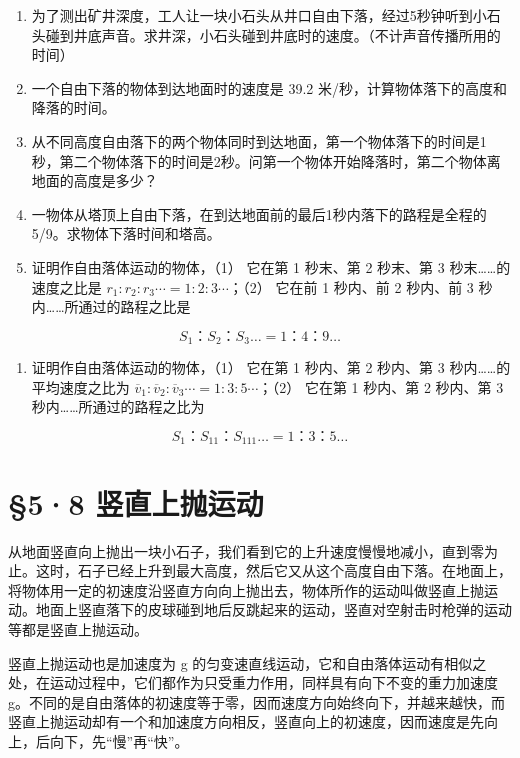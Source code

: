 \begin{enumerate}
\def\labelenumi{\arabic{enumi}.}
\item
  为了测出矿井深度，工人让一块小石头从井口自由下落，经过5秒钟听到小石头碰到井底声音。求井深，小石头碰到井底时的速度。（不计声音传播所用的时间）
\item
  一个自由下落的物体到达地面时的速度是 39.2
  米/秒，计算物体落下的高度和降落的时间。
\item
  从不同高度自由落下的两个物体同时到达地面，第一个物体落下的时间是1秒，第二个物体落下的时间是2秒。问第一个物体开始降落时，第二个物体离地面的高度是多少？
\item
  一物体从塔顶上自由下落，在到达地面前的最后1秒内落下的路程是全程的5/9。求物体下落时间和塔高。
\item
  证明作自由落体运动的物体，（1） 它在第 1 秒末、第 2 秒末、第 3
  秒末\ldots\ldots 的速度之比是
  \(r_1: r_2: r_3 \cdots = 1: 2: 3 \cdots\)；（2） 它在前 1 秒内、前 2
  秒内、前 3 秒内\ldots\ldots 所通过的路程之比是
\end{enumerate}

\[
S _ {1}\text{：} S _ {2}\text{：} S _ {3} \dots = 1\text{：} 4\text{：} 9 \dots
\]

\begin{enumerate}
\def\labelenumi{\arabic{enumi}.}
\setcounter{enumi}{5}
\tightlist
\item
  证明作自由落体运动的物体，（1） 它在第 1 秒内、第 2 秒内、第 3
  秒内\ldots\ldots 的平均速度之比为
  \(\overline{v}_{1}:\overline{v}_{2}:\overline{v}_{3}\cdots = 1:3:5\cdots\)；（2）
  它在第 1 秒内、第 2 秒内、第 3 秒内\ldots\ldots 所通过的路程之比为
\end{enumerate}

\[
S _ {1}\text{：} S _ {11}\text{：} S _ {111} \dots = 1\text{：} 3\text{：} 5 \dots
\]

\section{§5·8 竖直上抛运动}\label{ux7ad6ux76f4ux4e0aux629bux8fd0ux52a8}

从地面竖直向上抛出一块小石子，我们看到它的上升速度慢慢地减小，直到零为止。这时，石子已经上升到最大高度，然后它又从这个高度自由下落。在地面上，将物体用一定的初速度沿竖直方向向上抛出去，物体所作的运动叫做竖直上抛运动。地面上竖直落下的皮球碰到地后反跳起来的运动，竖直对空射击时枪弹的运动等都是竖直上抛运动。

竖直上抛运动也是加速度为 g
的匀变速直线运动，它和自由落体运动有相似之处，在运动过程中，它们都作为只受重力作用，同样具有向下不变的重力加速度
g。不同的是自由落体的初速度等于零，因而速度方向始终向下，并越来越快，而竖直上抛运动却有一个和加速度方向相反，竖直向上的初速度，因而速度是先向上，后向下，先``慢''再``快''。

